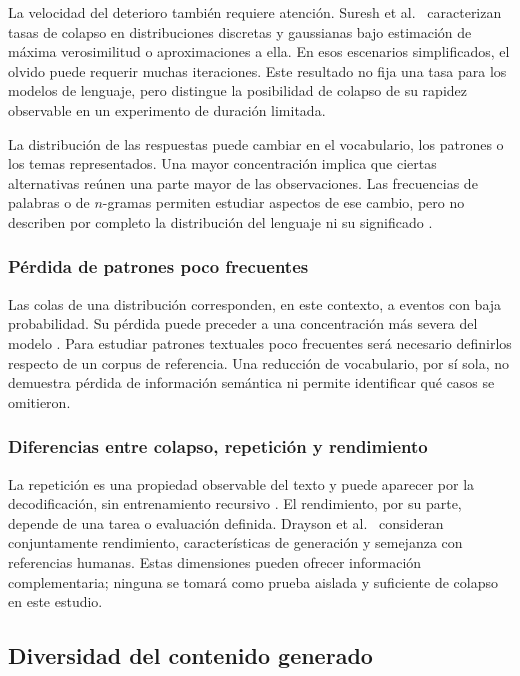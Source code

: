 \documentclass[12pt,letterpaper]{article}
\begin{document}
La velocidad del deterioro también requiere atención. Suresh et al.\
\cite{suresh2025} caracterizan tasas de colapso en distribuciones discretas
y gaussianas bajo estimación de máxima verosimilitud o aproximaciones a ella.
En esos escenarios simplificados, el olvido puede requerir muchas
iteraciones. Este resultado no fija una tasa para los modelos de lenguaje,
pero distingue la posibilidad de colapso de su rapidez observable en un
experimento de duración limitada.

La distribución de las respuestas puede cambiar en el vocabulario, los
patrones o los temas representados. Una mayor concentración implica que
ciertas alternativas reúnen una parte mayor de las observaciones. Las
frecuencias de palabras o de \(n\)-gramas permiten estudiar aspectos de ese
cambio, pero no describen por completo la distribución del lenguaje ni
su significado \cite{zhu2025}.

\subsubsection{Pérdida de patrones poco frecuentes}

Las colas de una distribución corresponden, en este contexto, a eventos
con baja probabilidad. Su pérdida puede preceder a una concentración más
severa del modelo \cite{shumailov2024}. Para estudiar patrones textuales
poco frecuentes será necesario definirlos respecto de un corpus de
referencia. Una reducción de vocabulario, por sí sola, no demuestra pérdida
de información semántica ni permite identificar qué casos se omitieron.

\subsubsection{Diferencias entre colapso, repetición y rendimiento}

La repetición es una propiedad observable del texto y puede aparecer por
la decodificación, sin entrenamiento recursivo \cite{holtzman2020}.
El rendimiento, por su parte, depende de una tarea o evaluación definida.
Drayson et al.\ \cite{drayson2025} consideran conjuntamente rendimiento,
características de generación y semejanza con referencias humanas. Estas
dimensiones pueden ofrecer información complementaria; ninguna se tomará
como prueba aislada y suficiente de colapso en este estudio.

\subsection{Diversidad del contenido generado}
\end{document}
